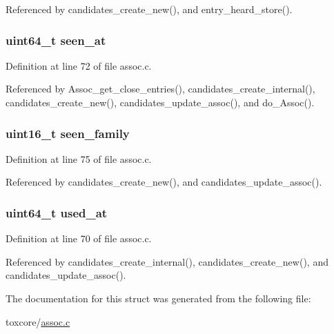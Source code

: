 Referenced by candidates\+\_\+create\+\_\+new(), and entry\+\_\+heard\+\_\+store().

\hypertarget{struct_client__entry_ab632ae1b8a283a06d6cb3881c377c6cd}{
\subsubsection[{seen\+\_\+at}]{\setlength{\rightskip}{0pt plus 5cm}uint64\+\_\+t seen\+\_\+at}}\label{struct_client__entry_ab632ae1b8a283a06d6cb3881c377c6cd}


Definition at line 72 of file assoc.\+c.



Referenced by Assoc\+\_\+get\+\_\+close\+\_\+entries(), candidates\+\_\+create\+\_\+internal(), candidates\+\_\+create\+\_\+new(), candidates\+\_\+update\+\_\+assoc(), and do\+\_\+\+Assoc().

\hypertarget{struct_client__entry_ac06f60c25b78ef1fce357680b1e5701f}{
\subsubsection[{seen\+\_\+family}]{\setlength{\rightskip}{0pt plus 5cm}uint16\+\_\+t seen\+\_\+family}}\label{struct_client__entry_ac06f60c25b78ef1fce357680b1e5701f}


Definition at line 75 of file assoc.\+c.



Referenced by candidates\+\_\+create\+\_\+new(), and candidates\+\_\+update\+\_\+assoc().

\hypertarget{struct_client__entry_aa4c583563fdc794eea3b70dcf92870f4}{
\subsubsection[{used\+\_\+at}]{\setlength{\rightskip}{0pt plus 5cm}uint64\+\_\+t used\+\_\+at}}\label{struct_client__entry_aa4c583563fdc794eea3b70dcf92870f4}


Definition at line 70 of file assoc.\+c.



Referenced by candidates\+\_\+create\+\_\+internal(), candidates\+\_\+create\+\_\+new(), and candidates\+\_\+update\+\_\+assoc().



The documentation for this struct was generated from the following file\+:\begin{DoxyCompactItemize}
\item 
toxcore/\hyperlink{assoc_8c}{assoc.\+c}\end{DoxyCompactItemize}
